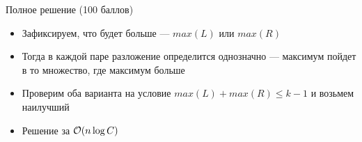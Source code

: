 \begin{frame}{Полное решение (100 баллов)}
  \begin{itemize}
    \item Зафиксируем, что будет больше --- $max(L)$ или $max(R)$
    \item Тогда в каждой паре разложение определится однозначно --- максимум пойдет в то множество, где максимум больше
    \item Проверим оба варианта на условие $max(L) + max(R) \le k - 1$ и возьмем наилучший
    \item Решение за $\mathcal{O}(n \log C)$
  \end{itemize}
\end{frame}
